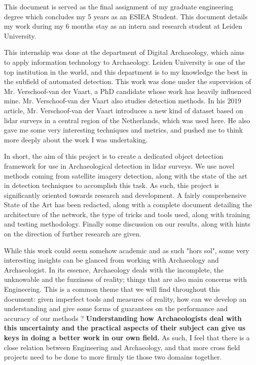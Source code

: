 This document is served as the final assignment of my graduate engineering degree which concludes my 5 years as an ESIEA Student.  This document details my work during my 6 months stay as an intern and research student at Leiden University.

This internship was done at the department of Digital Archaeology, which aims to apply information technology to Archaeology. Leiden University is one of the top institution in the world, and this department is to my knowledge the best in the subfield of automated detection. This work was done under the supervision of Mr. Verschoof-van der Vaart, a PhD candidate whose work has heavily influenced mine. Mr. Verschoof-van der Vaart also studies detection methods. In his 2019 article, Mr. Verschoof-van der Vaart introduces a new kind of dataset based on \gls{lidar} surveys in a central region of the Netherlands, which was used here. He also gave me some very interesting techniques and metrics, and pushed me to think more deeply about the work I was undertaking. 

In short, the aim of this project is to create a dedicated object detection framework for use in Archaeological detection in \gls{lidar} surveys. We use novel methods coming from satellite imagery detection, along with the state of the art in detection techniques to accomplish this task. As such, this project is significantly oriented towards research and development. A fairly comprehensive State of the Art has been redacted, along with a complete document detailing the architecture of the network, the type of tricks and tools used, along with training and testing methodology. Finally some discussion on our results, along with hints on the direction of further research are given. 

 While this work could seem somehow academic and as such "hors sol", some very interesting insights can be glanced from working with Archaeology and Archaeologist. In its essence, Archaeology deals with the incomplete, the unknowable and the fuzziness of reality; things that are also main concerns with Engineering. This is a common theme that we will find throughout this document: given imperfect tools and measures of reality, how can we develop an understanding and give some forms of guarantees on the performance and accuracy of our methods ?  \textbf{Understanding how Archaeologists deal with this uncertainty and the practical aspects of their subject can give us keys in doing a better work in our own field.} As such, I feel that there is a close relation between Engineering and Archaeology, and that more cross field projects need to be done to more firmly tie those two domains together.
